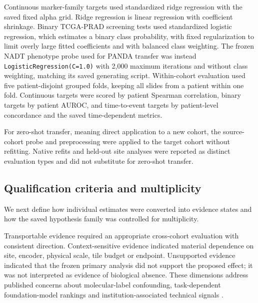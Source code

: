 Continuous marker-family targets used standardized ridge regression with the saved fixed
alpha grid. Ridge regression is linear regression with coefficient shrinkage. Binary
TCGA-PRAD screening tests used standardized logistic regression, which estimates a binary
class probability, with fixed regularization to limit overly large fitted coefficients and
with balanced class weighting. The frozen NADT phenotype probe used for
PANDA transfer was instead \texttt{LogisticRegression}\allowbreak\texttt{(C=1.0)} with 2,000 maximum iterations
and without class weighting, matching its saved generating script. Within-cohort evaluation
used five patient-disjoint grouped folds, keeping all slides from a patient within one fold.
Continuous targets were scored by patient Spearman correlation, binary targets by patient
AUROC, and time-to-event targets by patient-level concordance and the saved time-dependent
metrics.

For zero-shot transfer, meaning direct application to a new cohort, the source-cohort probe
and preprocessing were applied to the target cohort without refitting. Native refits and
held-out site analyses were reported as distinct
evaluation types and did not substitute for zero-shot transfer.

\subsection{Qualification criteria and multiplicity}

We next define how individual estimates were converted into evidence states and how the
saved hypothesis family was controlled for multiplicity.

Transportable evidence required an appropriate cross-cohort evaluation with consistent
direction. Context-sensitive evidence indicated material dependence on site, encoder,
physical scale, tile budget or endpoint. Unsupported evidence indicated that the frozen
primary analysis did not support the proposed effect; it was not interpreted as evidence of
biological absence. These dimensions address published concerns about molecular-label
confounding, task-dependent foundation-model rankings and institution-associated technical
signals \cite{dawood2026,neidlinger2025,pathorob2026}.

